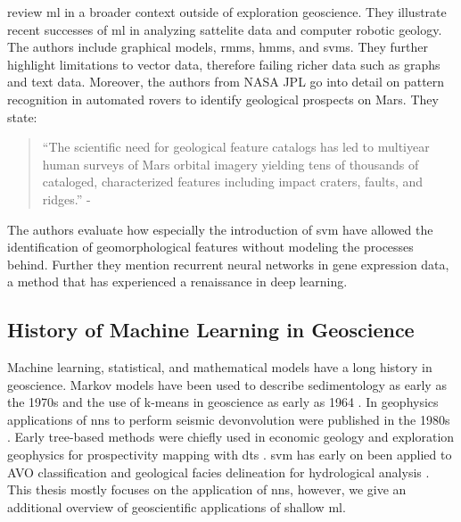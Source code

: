 \citet{Mjolsness2001-fq} review \ac{ml} in a broader context outside of exploration geoscience. They illustrate recent successes of \ac{ml} in analyzing sattelite data and computer robotic geology. The authors include graphical models, \acp{rmm}, \acp{hmm}, and \acp{svm}. They further highlight limitations to vector data, therefore failing richer data such as graphs and text data. Moreover, the authors from NASA JPL go into detail on pattern recognition in automated rovers to identify geological prospects on Mars. They state:
\begin{quote}
“The scientific need for geological feature catalogs has led to multiyear human surveys of Mars orbital imagery yielding tens of thousands of cataloged, characterized features including impact craters, faults, and ridges.” - \citep{Mjolsness2001-fq}
\end{quote}
The authors evaluate how especially the introduction of \ac{svm} have allowed the identification of geomorphological features without modeling the processes behind. Further they mention recurrent neural networks in gene expression data, a method that has experienced a renaissance in deep learning.

\subsection{History of Machine Learning in Geoscience}
Machine learning, statistical, and mathematical models have a long history in geoscience. Markov models have been used to describe sedimentology as early as the 1970s \citep{schwarzacher1972semi} and the use of k-means in geoscience as early as 1964 \citep{preston1964fourier}. In geophysics applications of \acp{nn} to perform seismic devonvolution were published in the 1980s \citet{Zhao1988-hu}. Early tree-based methods were chiefly used in economic geology and exploration geophysics for prospectivity mapping with \acfp{dt} \citep{newendorp1976decision,reddy1991decisiontree}. \ac{svm} has early on been applied to AVO classification \cite{Li2004-fk} and geological facies delineation for hydrological analysis \citep{Tartakovsky2004-ml}. This thesis mostly focuses on the application of \acp{nn}, however, we give an additional overview of geoscientific applications of shallow \ac{ml}.

